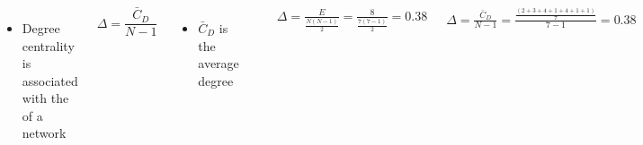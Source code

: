 \documentclass[8pt]{beamer}
\begin{document}

\begin{frame}
\frametitle{\insertsection}
\framesubtitle{\insertsubsection}

\begin{columns}
\begin{itemize}
\item Degree centrality is associated with the {\color{blue}{density}} of a network
\end{itemize}

\begin{equation*}
\Delta=\frac{\bar{C}_D}{N-1}
\end{equation*}

\begin{itemize}
\item $\bar{C}_D$ is the average degree
\end{itemize}


\centering
\includegraphics[width=5cm]{base}\\
\medskip

$\Delta=\frac{E}{\frac{N(N-1)}{2}}=\frac{8}{\frac{7(7-1)}{2}}=0.38$\\
\medskip

$\Delta=\frac{\bar{C}_D}{N-1}=\frac{\frac{(2+3+4+1+4+1+1)}{7}}{7-1}=0.38$

\end{columns}




\end{frame}

\end{document}
